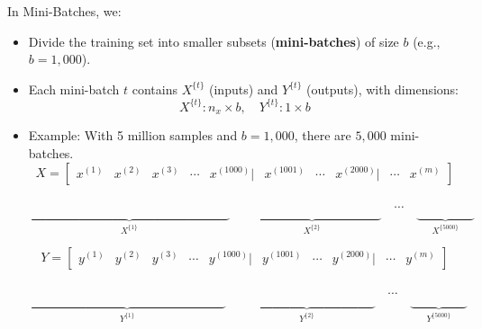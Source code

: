 \documentclass[letterpaper,12pt,notitlepage,twoside]{report}
\begin{document}
In Mini-Batches, we:
\begin{itemize}[nosep]
    \item Divide the training set into smaller subsets (\textbf{mini-batches}) of size $b$ (e.g., $b = 1,000$).
    \item Each mini-batch $t$ contains $X^{\{t\}}$ (inputs) and $Y^{\{t\}}$ (outputs), with dimensions:
    \[
    X^{\{t\}}: n_x \times b, \quad Y^{\{t\}}: 1 \times b
    \]
    \item Example: With 5 million samples and $b = 1,000$, there are $5,000$ mini-batches.
	\[
	X = 
	\begin{bmatrix}
	x^{(1)} & x^{(2)} & x^{(3)} & \cdots & x^{(1000)} | & x^{(1001)} & \cdots & x^{(2000)} | & \cdots & x^{(m)}
	\end{bmatrix}
	\]
	
	\vspace{-3.0em}

	\[
	\underbrace{\phantom{
	\begin{bmatrix}
	x^{(1)} & x^{(2)} & x^{(3)} & \cdots & x^{(1000)}
	\end{bmatrix}
	}}_{X^{\{1\}}}
	\quad
	\underbrace{\phantom{
	\begin{bmatrix}
	x^{(1001)} & \cdots & x^{(2000)}
	\end{bmatrix}
	}}_{X^{\{2\}}}
	\quad
	\cdots
	\quad
	\underbrace{\phantom{
	\begin{bmatrix}
	x^{(m)}
	\end{bmatrix}
	}}_{X^{\{5000\}}}
	\]

	\[
	Y = 
	\begin{bmatrix}
	y^{(1)} & y^{(2)} & y^{(3)} & \cdots & y^{(1000)} | & y^{(1001)} & \cdots & y^{(2000)} | & \cdots & y^{(m)}
	\end{bmatrix}
	\]
	
	\vspace{-3.0em}

	\[
	\underbrace{\phantom{
	\begin{bmatrix}
	y^{(1)} & y^{(2)} & y^{(3)} & \cdots & y^{(1000)}
	\end{bmatrix}
	}}_{Y^{\{1\}}}
	\quad
	\underbrace{\phantom{
	\begin{bmatrix}
	y^{(1001)} & \cdots & y^{(2000)}
	\end{bmatrix}
	}}_{Y^{\{2\}}}
	\quad
	\cdots
	\quad
	\underbrace{\phantom{
	\begin{bmatrix}
	y^{(m)}
	\end{bmatrix}
	}}_{Y^{\{5000\}}}
	\]
\end{itemize}
\end{document}
